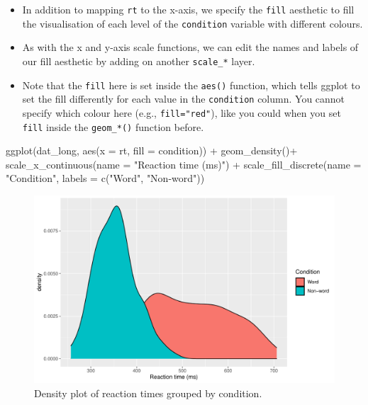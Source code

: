 \documentclass[
  english,
  doc,floatsintext]{apa6}
\newenvironment{Shaded}{\begin{snugshade}}{\end{snugshade}}
\newcommand{\AttributeTok}[1]{\textcolor[rgb]{0.77,0.63,0.00}{#1}}
\newcommand{\FunctionTok}[1]{\textcolor[rgb]{0.00,0.00,0.00}{#1}}
\newcommand{\NormalTok}[1]{#1}
\newcommand{\SpecialCharTok}[1]{\textcolor[rgb]{0.00,0.00,0.00}{#1}}
\newcommand{\StringTok}[1]{\textcolor[rgb]{0.31,0.60,0.02}{#1}}
\providecommand{\tightlist}{%
  \setlength{\itemsep}{0pt}\setlength{\parskip}{0pt}}
\begin{document}
\begin{itemize}
\tightlist
\item
  In addition to mapping \texttt{rt} to the x-axis, we specify the \texttt{fill} aesthetic to fill the visualisation of each level of the \texttt{condition} variable with different colours.
\item
  As with the x and y-axis scale functions, we can edit the names and labels of our fill aesthetic by adding on another \texttt{scale\_*} layer.
\item
  Note that the \texttt{fill} here is set inside the \texttt{aes()} function, which tells ggplot to set the fill differently for each value in the \texttt{condition} column. You cannot specify which colour here (e.g., \texttt{fill="red"}), like you could when you set \texttt{fill} inside the \texttt{geom\_*()} function before.
\end{itemize}

\begin{Shaded}
\begin{Highlighting}[]
\FunctionTok{ggplot}\NormalTok{(dat\_long, }\FunctionTok{aes}\NormalTok{(}\AttributeTok{x =}\NormalTok{ rt, }\AttributeTok{fill =}\NormalTok{ condition)) }\SpecialCharTok{+}
  \FunctionTok{geom\_density}\NormalTok{()}\SpecialCharTok{+}
  \FunctionTok{scale\_x\_continuous}\NormalTok{(}\AttributeTok{name =} \StringTok{"Reaction time (ms)"}\NormalTok{) }\SpecialCharTok{+}
  \FunctionTok{scale\_fill\_discrete}\NormalTok{(}\AttributeTok{name =} \StringTok{"Condition"}\NormalTok{,}
                      \AttributeTok{labels =} \FunctionTok{c}\NormalTok{(}\StringTok{"Word"}\NormalTok{, }\StringTok{"Non{-}word"}\NormalTok{))}
\end{Highlighting}
\end{Shaded}

\begin{figure}

{\centering \includegraphics[width=1\linewidth]{images/density-grouped-1} 

}

\caption{Density plot of reaction times grouped by condition.}\label{fig:density-grouped}
\end{figure}
\end{document}
